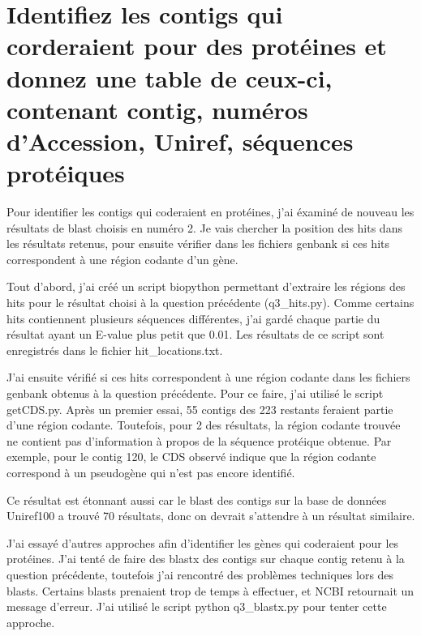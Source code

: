 \documentclass[10.9pt]{article} %
\begin{document}


 
\section{Identifiez les contigs qui corderaient pour des protéines et donnez une table de ceux-ci,
contenant contig, numéros d'Accession, Uniref, séquences protéiques} %

Pour identifier les contigs qui coderaient en protéines, j'ai éxaminé de nouveau les résultats de 
blast choisis en numéro 2. Je vais chercher la position des hits dans les résultats retenus, pour
ensuite vérifier dans les fichiers genbank si ces hits correspondent à une région codante d'un gène.

Tout d'abord, j'ai créé un script biopython permettant d'extraire les régions des hits pour le résultat
choisi à la question précédente (q3\_hits.py). Comme certains hits contiennent plusieurs séquences
différentes, j'ai gardé chaque partie du résultat ayant un E-value plus petit que 0.01. Les résultats
de ce script sont enregistrés dans le fichier hit\_locations.txt.


J'ai ensuite vérifié si ces hits correspondent à une région codante dans les fichiers genbank obtenus
à la question précédente. Pour ce faire, j'ai utilisé le script getCDS.py. Après un premier essai,
55 contigs des 223 restants feraient partie d'une région codante. Toutefois, pour 2 des résultats, la
région codante trouvée ne contient pas d'information à propos de la séquence protéique obtenue. Par exemple,
pour le contig 120, le CDS observé indique que la région codante correspond à un pseudogène qui n'est pas
encore identifié.

Ce résultat est étonnant aussi car le blast des contigs sur la base de données Uniref100 a trouvé 70 résultats, donc
on devrait s'attendre à un résultat similaire. 

J'ai essayé d'autres approches afin d'identifier les gènes qui coderaient pour les protéines. J'ai tenté de faire des
blastx des contigs sur chaque contig retenu à la question précédente, toutefois j'ai rencontré des problèmes techniques
lors des blasts. Certains blasts prenaient trop de temps à effectuer, et NCBI retournait un message d'erreur.
J'ai utilisé le script python q3\_blastx.py pour tenter cette approche.
\end{document}
